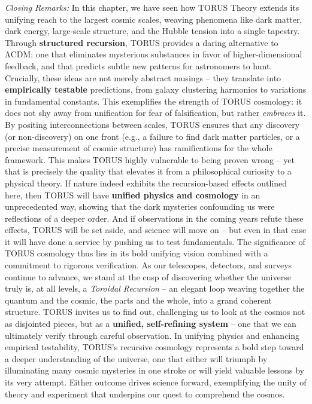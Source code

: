 \documentclass[]{article}
\begin{document}
\emph{Closing Remarks:} In this chapter, we have seen how TORUS Theory
extends its unifying reach to the largest cosmic scales, weaving
phenomena like dark matter, dark energy, large-scale structure, and the
Hubble tension into a single tapestry. Through \textbf{structured
recursion}, TORUS provides a daring alternative to ΛCDM: one that
eliminates mysterious substances in favor of higher-dimensional
feedback, and that predicts subtle new patterns for astronomers to hunt.
Crucially, these ideas are not merely abstract musings -- they translate
into \textbf{empirically testable} predictions, from galaxy clustering
harmonics to variations in fundamental constants​. This exemplifies the
strength of TORUS cosmology: it does not shy away from unification for
fear of falsification, but rather \emph{embraces} it. By positing
interconnections between scales, TORUS ensures that any discovery (or
non-discovery) on one front (e.g., a failure to find dark matter
particles, or a precise measurement of cosmic structure) has
ramifications for the whole framework. This makes TORUS highly
vulnerable to being proven wrong -- yet that is precisely the quality
that elevates it from a philosophical curiosity to a physical theory. If
nature indeed exhibits the recursion-based effects outlined here, then
TORUS will have \textbf{unified physics and cosmology} in an
unprecedented way, showing that the dark mysteries confounding us were
reflections of a deeper order. And if observations in the coming years
refute these effects, TORUS will be set aside, and science will move on
-- but even in that case it will have done a service by pushing us to
test fundamentals. The significance of TORUS cosmology thus lies in its
bold unifying vision combined with a commitment to rigorous
verification. As our telescopes, detectors, and surveys continue to
advance, we stand at the cusp of discovering whether the universe truly
is, at all levels, a \emph{Toroidal Recursion} -- an elegant loop
weaving together the quantum and the cosmic, the parts and the whole,
into a grand coherent structure. TORUS invites us to find out,
challenging us to look at the cosmos not as disjointed pieces, but as a
\textbf{unified, self-refining system} -- one that we can ultimately
verify through careful observation​. In unifying physics and enhancing
empirical testability, TORUS's recursive cosmology represents a bold
step toward a deeper understanding of the universe, one that either will
triumph by illuminating many cosmic mysteries in one stroke or will
yield valuable lessons by its very attempt​. Either outcome drives
science forward, exemplifying the unity of theory and experiment that
underpins our quest to comprehend the cosmos.
\end{document}
